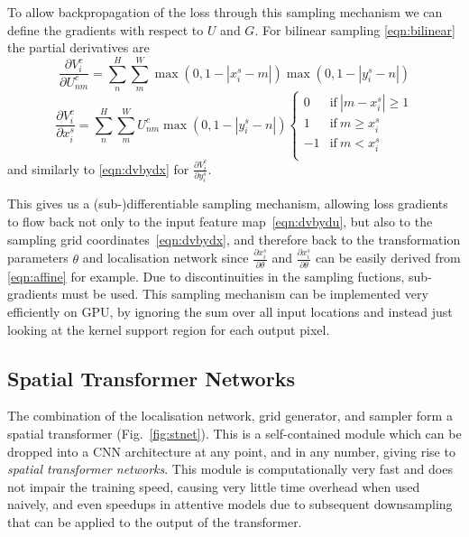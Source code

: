 \documentclass{article} %
\newcommand{\figref}[1]{Fig.~\ref{#1}}
\begin{document}
To allow backpropagation of the loss through this sampling mechanism we can
define the gradients with respect to $U$ and $G$. For bilinear sampling
\eqref{eqn:bilinear} the partial derivatives are
\begin{equation}
\frac{\partial V^c_i}{\partial U^c_{nm}} =
\sum_{n}^{H} \sum_{m}^W \max(0, 1-|x_i^s-m|)\max(0,1-|y_i^s-n|)
\label{eqn:dvbydu}
\end{equation}
\begin{equation}
\frac{\partial V^c_i}{\partial x_i^s} =
\sum_{n}^{H} \sum_{m}^W U^c_{nm}\max(0,1-|y_i^s-n|)
\begin{cases}
		0  & \mbox{if}~ |m - x_i^s| \ge 1 \\
		1  & \mbox{if}~ m \ge x_i^s\\
		-1  & \mbox{if}~ m < x_i^s\\
\end{cases}
\label{eqn:dvbydx}
\end{equation}
and similarly to \eqref{eqn:dvbydx} for $\frac{\partial V^c_i}{\partial
y_i^s}$.

This gives us a (sub-)differentiable sampling mechanism, allowing loss gradients to
flow back not only to the input feature map~\eqref{eqn:dvbydu}, but also to the sampling grid
coordinates~\eqref{eqn:dvbydx}, and therefore back to the transformation parameters $\theta$ and
localisation network since $\frac{\partial x_i^s}{\partial \theta}$ and
$\frac{\partial x_i^s}{\partial \theta}$ can be easily derived from
\eqref{eqn:affine} for example. Due to discontinuities in the sampling fuctions,
sub-gradients must be used. This sampling mechanism can be implemented very
efficiently on GPU, by ignoring the sum over all input locations and instead just
looking at the kernel support region for each output pixel.

\subsection{Spatial Transformer Networks}
The combination of the localisation network, grid generator, and sampler form a
spatial transformer (\figref{fig:stnet}). This is a self-contained module which can
be dropped into a CNN architecture at any point, and in any number, giving rise
to \emph{spatial transformer networks}. This module is computationally very fast
and does not impair the training speed, causing very
little time overhead when used naively, and even speedups in attentive models due to subsequent downsampling that can be applied to the output of the transformer.
\end{document}
